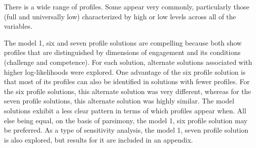 \documentclass[]{book}
\theoremstyle{definition}
\theoremstyle{definition}
\theoremstyle{definition}
\theoremstyle{remark}
\begin{document}
There is a wide range of profiles. Some appear very commonly,
particularly those (full and universally low) characterized by high or
low levels across all of the variables.

\begin{landscape}\begin{table}

\caption{\label{tab:compare-profiles-by-solution}Profile assignments by LPA solution}
\centering
{}
\end{table}
\end{landscape}

The model 1, six and seven profile solutions are compelling because both
show profiles that are distinguished by dimensions of engagement and its
conditions (challenge and competence). For each solution, alternate
solutions associated with higher log-likelihoods were explored. One
advantage of the six profile solution is that most of its profiles can
also be identified in solutions with fewer profiles. For the six profile
solutions, this alternate solution was very different, whereas for the
seven profile solutions, this alternate solution was highly similar. The
model solutions exhibit a less clear pattern in terms of which profiles
appear when. All else being equal, on the basis of parsimony, the model
1, six profile solution may be preferred. As a type of sensitivity
analysis, the model 1, seven profile solution is also explored, but
results for it are included in an appendix.
\end{document}
